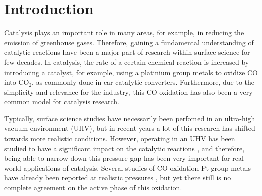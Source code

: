 \documentclass[aps,prl,groupedaddress,twocolumn]{revtex4-1}
\begin{document}

\maketitle


\section{Introduction}\label{intro}
Catalysis plays an important role in many areas, for example, in reducing the emission of greenhouse gases. Therefore, gaining a fundamental understanding of catalytic reactions have been a major part of research within surface science for few decades. In catalysis, the rate of a certain chemical reaction is increased by introducing a catalyst, for example, using a platinium group metals to oxidize CO into CO$_2$, as commonly done in car catalytic converters. Furthermore, due to the simplicity and relevance for the industry, this CO oxidation has also been a very common model for catalysis research. 

Typically, surface science studies have necessarily been perfomed in an ultra-high vacuum environment (UHV), but in recent years a lot of this research has shifted towards more realistic conditions. However, operating in an UHV has been studied to have a significant impact on the catalytic reactions \cite{pressure}, and therefore, being able to narrow down this pressure gap has been very important for real world applications of catalysis. Several studies of CO oxidation Pt group metals have already been reported at realistic pressures \cite{1,2,3}, but yet there still is no complete agreement on the active phase of this oxidation. 
\end{document}
